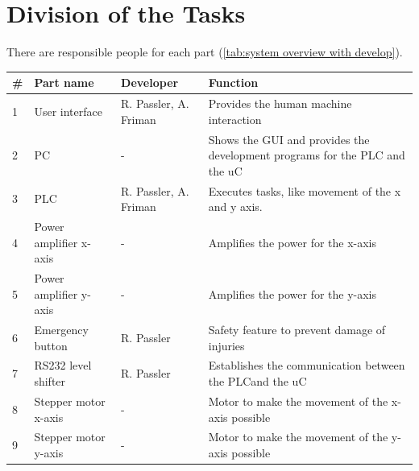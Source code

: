 \documentclass[a4paper,12pt]{scrreprt}
\begin{document}
\section{Division of the Tasks}

There are responsible people for each part (\autoref{tab:system overview with develop}).

\begin{table}[H]
\centering
\begin{tabular}{|p{0.5cm}|p{4cm}|p{2cm}|p{8cm}|}
\hline
\textbf{\#} & \textbf{Part name }                & \textbf{Developer}  & \textbf{Function                                                                                                         } \\ \hline
1  & User interface            & R. Passler, A. Friman & Provides the human machine interaction                                                                            \\ \hline
2  & PC                        & -          & Shows the GUI and provides the development programs for the \acs{PLC} and the \acs{uC}                           \\ \hline
3  & \acs{PLC}                      & R. Passler, A. Friman & Executes tasks, like movement of the x and y axis.                                                                \\ \hline
4  & Power amplifier x-axis    & -          & Amplifies the power for the x-axis                                                                                \\ \hline
5  & Power amplifier y-axis    & -          & Amplifies the power for the y-axis                                                                                \\ \hline
6  & Emergency button          & R. Passler & Safety feature to prevent damage of injuries                                                                      \\ \hline
7  & \acs{RS232} level shifter       & R. Passler & Establishes the communication between the \acs{PLC}and the \acs{uC}                                             \\ \hline
8  & Stepper motor x-axis      & -          & Motor to make the movement of the x-axis possible                                                                 \\ \hline
9  & Stepper motor y-axis      & -          & Motor to make the movement of the y-axis possible                                                                 \\ \hline

\end{tabular}
\end{table}
\end{document}
